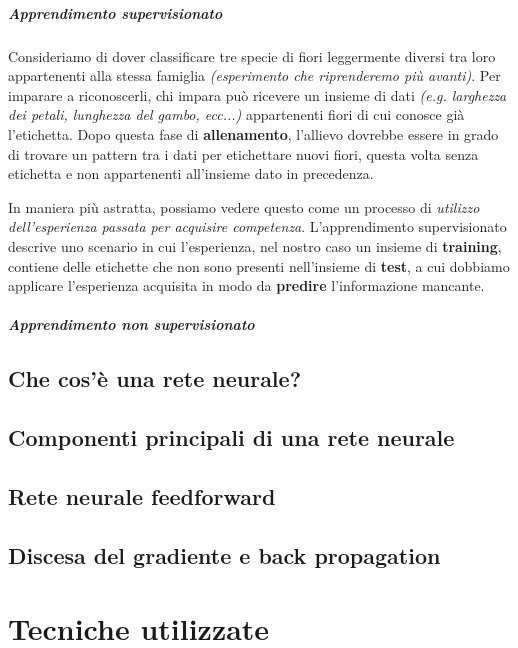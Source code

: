 \documentclass[12pt, twoside, letterpaper]{report}
\begin{document}
				\paragraph{Apprendimento supervisionato} Consideriamo di dover classificare tre specie di fiori leggermente diversi tra loro appartenenti alla stessa famiglia \textit{(esperimento che riprenderemo più avanti)}. Per imparare a riconoscerli, chi impara può ricevere un insieme di dati \textit{(e.g. larghezza dei petali, lunghezza del gambo, ecc...)} appartenenti  fiori di cui conosce già l'etichetta. Dopo questa fase di \textbf{allenamento}, l'allievo dovrebbe essere in grado di trovare un pattern tra i dati per etichettare nuovi fiori, questa volta senza etichetta e non appartenenti all'insieme dato in precedenza. 
				
				In maniera più astratta, possiamo vedere questo come un processo di \textit{utilizzo dell'esperienza passata per acquisire competenza}. L'apprendimento supervisionato descrive uno scenario in cui l'esperienza, nel nostro caso un insieme di \textbf{training}, contiene delle etichette che non sono presenti nell'insieme di \textbf{test}, a cui dobbiamo applicare l'esperienza acquisita in modo da \textbf{predire} l'informazione mancante.
				
				\paragraph{Apprendimento non supervisionato} 
												
			
			
		\section{Che cos'è una rete neurale?}
		\section{Componenti principali di una rete neurale}
		\section{Rete neurale feedforward}
		\section{Discesa del gradiente e back propagation}
		
	\chapter{Tecniche utilizzate}
\end{document}
